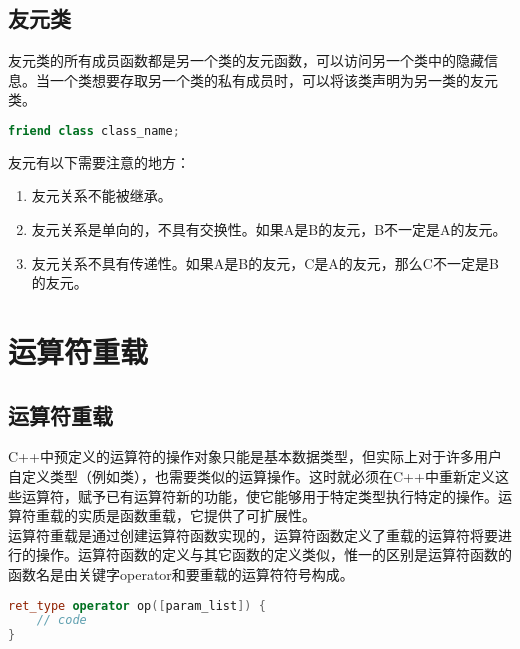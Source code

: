 \vspace{0.5cm}

\subsection{友元类}

友元类的所有成员函数都是另一个类的友元函数，可以访问另一个类中的隐藏信息。当一个类想要存取另一个类的私有成员时，可以将该类声明为另一类的友元类。

\vspace{-0.5cm}

\begin{lstlisting}[language=C++]
friend class class_name;
\end{lstlisting}

友元有以下需要注意的地方：

\begin{enumerate}
	\item 友元关系不能被继承。
	\item 友元关系是单向的，不具有交换性。如果A是B的友元，B不一定是A的友元。
	\item 友元关系不具有传递性。如果A是B的友元，C是A的友元，那么C不一定是B的友元。
\end{enumerate}

\newpage

\section{运算符重载}

\subsection{运算符重载}

C++中预定义的运算符的操作对象只能是基本数据类型，但实际上对于许多用户自定义类型（例如类），也需要类似的运算操作。这时就必须在C++中重新定义这些运算符，赋予已有运算符新的功能，使它能够用于特定类型执行特定的操作。运算符重载的实质是函数重载，它提供了可扩展性。\\

运算符重载是通过创建运算符函数实现的，运算符函数定义了重载的运算符将要进行的操作。运算符函数的定义与其它函数的定义类似，惟一的区别是运算符函数的函数名是由关键字operator和要重载的运算符符号构成。

\vspace{-0.5cm}

\begin{lstlisting}[language=C++]
ret_type operator op([param_list]) {
    // code
}
\end{lstlisting}

